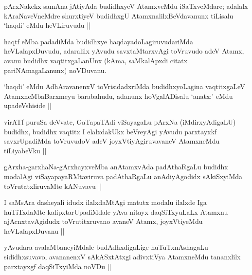\begin{artha}
pArxNakekx samAna jAtiyAda budidhxyeV AtamxveMdu iSaTxveMdare; adalalx kAraNaveVneMdre shurxtiyeV budidhxgU AtamxnalilxBeVdavanunx tiLisalu `haqdi' eMdu heVLiruvudu ||
\end{artha}

\begin{artha}
haqtf eMba padadiMda budidhxye haqdayadoLagiruvudariMda heVLalapxDuvudu, adaralilx yAvudu savxtaMtarxvAgi toVruvudo adeV Atamx, avanu budidhx vaqtitxgaLanUnx (kAma, saMkalApxdi citatx pariNAmagaLanunx) noVDuvanu.
\end{artha}

\begin{artha}
`haqdi' eMdu AdhAravanenxV toVrisidadxriMda budidhxyoLagina vaqtitxgaLeV AtamxneMbaBarxmeyu barabahudu, adanunx hoVgalADisalu `anatx:' eMdu upadeVshiside ||
\end{artha}

\begin{artha}
virATf puruSa deVvate, GaTapaTAdi viSayagaLu pArxNa (iMdirxyAdigaLU) budidhx, budidhx vaqtitx I elalxdakUkx beVreyAgi yAvudu parxtayxkf savxrUpadiMda toVruvudoV adeV joyxVtiyAgiruvavaneV AtamxneMdu tiLiyabeVku ||
\end{artha}

\begin{artha}
gArxha-garxhaNa-gArxhayxveMba anAtamxvAda padAthaRgaLu budidhx modalAgi viSayapayaRMtaviruva padAthaRgaLu anAdiyAgodidx sAkiSxyiMda toVrutatxliruvaMte kANuvavu ||
\end{artha}

\begin{artha}
I saMsAra dasheyali idudx ilalxdaMtAgi matutx modalu ilalxde Iga huTiTxdaMte kalipxtarUpadiMdale yAva nitayx daqSiTxyuLaLx Atamxnu ajAcnxtavAgidudx toVrutitxruvano avaneV Atamx, joyxVtiyeMdu heVLalapxDuvanu ||
\end{artha}

\begin{artha}
yAvudara avalaMbaneyiMdale budAdhxdigaLige huTuTxnAshagaLu sididhxsuvavo, avananenxV sAkASxtAtxgi adivxtiVya AtamxneMdu tananxlilx parxtayxgf daqSiTxyiMda noVDu ||
\end{artha}

